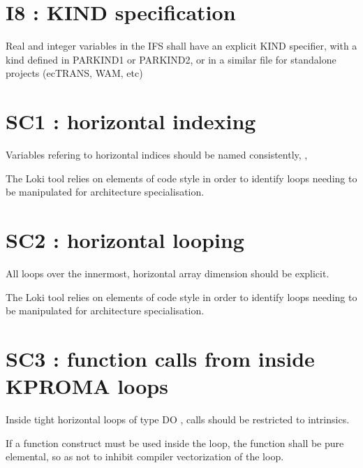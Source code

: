 \documentclass[letterpaper,10pt,english]{sphinxmanual}
\begin{document}
\sphinxstepscope


\section{I8 : KIND specification}
\label{\detokenize{rules/I8:i8-kind-specification}}\label{\detokenize{rules/I8::doc}}
\sphinxAtStartPar
Real and integer variables in the IFS shall have an explicit KIND specifier, with
a kind defined in PARKIND1 or PARKIND2, or in a similar file for stand\sphinxhyphen{}alone projects
(ecTRANS, WAM, etc)

\sphinxstepscope


\section{SC1 : horizontal indexing}
\label{\detokenize{rules/SC1:sc1-horizontal-indexing}}\label{\detokenize{rules/SC1::doc}}
\sphinxAtStartPar
Variables refering to horizontal indices should be named consistently, , 

\sphinxAtStartPar
The Loki tool relies on elements of code style in order to identify loops needing to be manipulated
for architecture specialisation.

\sphinxstepscope


\section{SC2 : horizontal looping}
\label{\detokenize{rules/SC2:sc2-horizontal-looping}}\label{\detokenize{rules/SC2::doc}}
\sphinxAtStartPar
All loops over the innermost, horizontal array dimension should be explicit.

\sphinxAtStartPar
The Loki tool relies on elements of code style in order to identify loops needing to be manipulated
for architecture specialisation.

\sphinxstepscope


\section{SC3 : function calls from inside KPROMA loops}
\label{\detokenize{rules/SC3:sc3-function-calls-from-inside-kproma-loops}}\label{\detokenize{rules/SC3::doc}}
\sphinxAtStartPar
Inside tight horizontal loops of type DO , calls should be restricted to intrinsics.

\sphinxAtStartPar
If a function construct must be used inside the loop, the function shall be pure elemental, so as not
to inhibit compiler vectorization of the loop.
\end{document}
